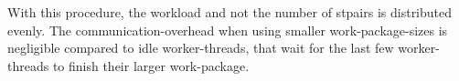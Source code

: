         With this procedure, the workload and not the number of \glspl{stpair} is distributed evenly.
        The communication-overhead when using smaller work-package-sizes is negligible compared to idle worker-threads, that wait for the last few worker-threads to finish their larger work-package.